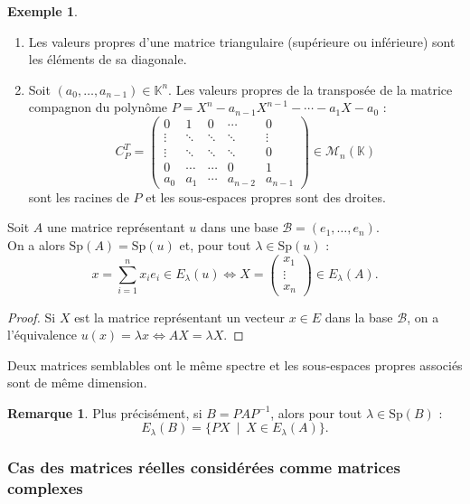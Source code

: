 \documentclass[french]{article}
\newcommand{\K}{\mathbb{K}}
\newcommand{\inv}{^{-1}}
\newcommand{\Sp}{\text{Sp}}
\theoremstyle{plain}
\theoremstyle{definition}
\newtheorem*{ex}{Exemple}
\newtheorem*{rmq}{Remarque}
\theoremstyle{remark}
\begin{document}
	\begin{ex}
		\begin{enumerate}
			\item Les valeurs propres d'une matrice triangulaire (supérieure ou inférieure) sont les éléments de sa diagonale.
			\item Soit $(a_0,\ldots,a_{n-1})\in\K^n$. Les valeurs propres de la transposée de la matrice compagnon du polynôme $P=X^n-a_{n-1}X^{n-1}-\cdots-a_1X-a_0$ : $$C_P^T=\begin{pmatrix}
				0&1&0&\cdots&0\\
				\vdots&\ddots&\ddots&\ddots&\vdots\\
				\vdots&\ddots&\ddots&\ddots&0\\
				0&\cdots&\cdots&0&1\\
				a_0&a_1&\cdots&a_{n-2}&a_{n-1}
			\end{pmatrix}\in\mathcal{M}_n(\K)$$ sont les racines de $P$ et les sous-espaces propres sont des droites.
		\end{enumerate}
	\end{ex}
	
	\begin{prop}%
		Soit $A$ une matrice représentant $u$ dans une base $\mathcal{B}=(e_1,\ldots,e_n)$.\\
		On a alors $\Sp(A)=\Sp(u)$ et, pour tout $\lambda\in\Sp(u)$ : $$x=\sum_{i=1}^{n}x_ie_i\in E_\lambda(u)\iff X=\begin{pmatrix}
			x_1\\
			\vdots\\
			x_n
		\end{pmatrix}\in E_\lambda(A).$$
	\end{prop}
	\begin{proof}
		Si $X$ est la matrice représentant un vecteur $x\in E$ dans la base $\mathcal{B}$, on a l'équivalence $u(x)=\lambda x\iff AX=\lambda X$.
	\end{proof}
	
	\begin{cor}{}%
		Deux matrices semblables ont le même spectre et les sous-espaces propres associés sont de même dimension.
	\end{cor}
	
	\begin{rmq}
		Plus précisément, si $B=PAP\inv$, alors pour tout $\lambda\in\Sp(B)$ : $$E_\lambda(B)=\{PX\ \mid\ X\in E_\lambda(A)\}.$$
	\end{rmq}
	
	\subsubsection*{Cas des matrices réelles considérées comme matrices complexes}
	
\end{document}
